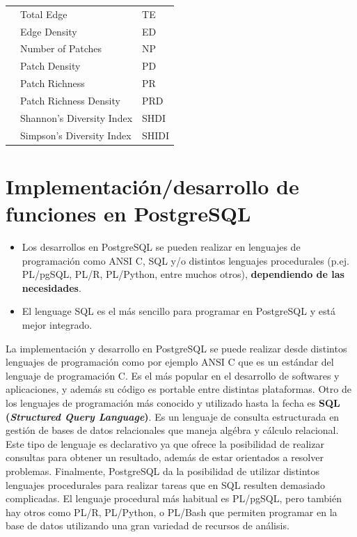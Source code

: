 \begin{table}[]
\begin{tabular}{lll}
                           & Total Edge                           & TE                   \\
                           & Edge Density                         & ED                   \\
                           & Number of Patches                    & NP                   \\
                           & Patch Density                        & PD                   \\
                           & Patch Richness                       & PR                   \\
                           & Patch Richness Density               & PRD                  \\
                           & Shannon's Diversity Index            & SHDI                 \\
                           & Simpson's Diversity Index            & SHIDI                \\ \hline
\end{tabular}
\end{table}


\section{Implementación/desarrollo de funciones en PostgreSQL}

\begin{graybox}
\begin{itemize}
\item Los desarrollos en PostgreSQL se pueden realizar en lenguajes de programación como ANSI C, SQL y/o distintos lenguajes procedurales (p.ej. PL/pgSQL, PL/R, PL/Python, entre muchos otros), \textbf{dependiendo de las necesidades}.
\item El lenguage SQL es el más sencillo para programar en PostgreSQL y está mejor integrado.
\end{itemize}
\end{graybox}

La implementación y desarrollo en PostgreSQL se puede realizar desde distintos lenguajes de programación como por ejemplo ANSI C que es un estándar del lenguaje de programación C. Es el más popular en el desarrollo de softwares y aplicaciones, y además su código es portable entre distintas plataformas. Otro de los lenguajes de programación más conocido y utilizado hasta la fecha es \textbf{SQL (\textit{Structured Query Language})}. Es un lenguaje de consulta estructurada en gestión de bases de datos relacionales que maneja algébra y cálculo relacional. Este tipo de lenguaje es declarativo ya que ofrece la posibilidad de realizar consultas para obtener un resultado, además de estar orientados a resolver problemas. Finalmente, PostgreSQL da la posibilidad de utilizar distintos lenguajes procedurales para realizar tareas que en SQL resulten demasiado complicadas. El lenguaje procedural más habitual es PL/pgSQL, pero también hay otros como PL/R, PL/Python, o PL/Bash que permiten programar en la base de datos utilizando una gran variedad de recursos de análisis.


